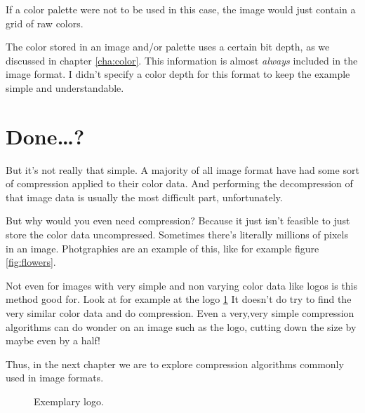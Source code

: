 \begin{refsection}
  If a color palette were not to be used in this case, the image would
  just contain a grid of raw colors.

  The color stored in an image and/or palette uses a certain bit
  depth, as we discussed in chapter \ref{cha:color}. This information
  is almost \textit{always} included in the image format. I didn't
  specify a color depth for this format to keep the example simple and
  understandable.

  \section{Done\dots?}
  \label{sec:done}

  But it's not really that simple. A majority of all image format have
  had some sort of compression applied to their color data. And
  performing the decompression of that image data is usually the
  most difficult part, unfortunately.

  But why would you even need compression?  Because it just isn't
  feasible to just store the color data uncompressed. Sometimes
  there's literally millions of pixels in an image. Photgraphies are
  an example of this, like for example figure \ref{fig:flowers}.

  Not even for images with very simple and non varying color data like
  logos is this method good for. Look at for example at the logo
  \ref{fig:logo} It doesn't do try to find the very similar color data
  and do compression. Even a very,very simple compression algorithms
  can do wonder on an image such as the logo,  cutting down the size by
  maybe even by a half!

  Thus, in the next chapter we are to explore compression algorithms
  commonly used in image formats.


  \begin{figure}
    \centering
    \newcommand{\shieldcolor}{red}
    \caption{Exemplary logo.}
    \label{fig:logo}
  \end{figure}


\end{refsection}
